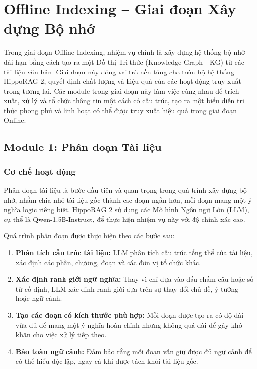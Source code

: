 \section{Offline Indexing – Giai đoạn Xây dựng Bộ nhớ}

Trong giai đoạn Offline Indexing, nhiệm vụ chính là xây dựng hệ thống bộ nhớ dài hạn bằng cách tạo ra một Đồ thị Tri thức (Knowledge Graph - KG) từ các tài liệu văn bản. Giai đoạn này đóng vai trò nền tảng cho toàn bộ hệ thống HippoRAG 2, quyết định chất lượng và hiệu quả của các hoạt động truy xuất trong tương lai. Các module trong giai đoạn này làm việc cùng nhau để trích xuất, xử lý và tổ chức thông tin một cách có cấu trúc, tạo ra một biểu diễn tri thức phong phú và linh hoạt có thể được truy xuất hiệu quả trong giai đoạn Online.

\subsection{Module 1: Phân đoạn Tài liệu}

\subsubsection{Cơ chế hoạt động}
Phân đoạn tài liệu là bước đầu tiên và quan trọng trong quá trình xây dựng bộ nhớ, nhằm chia nhỏ tài liệu gốc thành các đoạn ngắn hơn, mỗi đoạn mang một ý nghĩa logic riêng biệt. HippoRAG 2 sử dụng các Mô hình Ngôn ngữ Lớn (LLM), cụ thể là Qwen-1.5B-Instruct, để thực hiện nhiệm vụ này với độ chính xác cao.

Quá trình phân đoạn được thực hiện theo các bước sau:
\begin{enumerate}
    \item \textbf{Phân tích cấu trúc tài liệu:} LLM phân tích cấu trúc tổng thể của tài liệu, xác định các phần, chương, đoạn và các đơn vị tổ chức khác.
    \item \textbf{Xác định ranh giới ngữ nghĩa:} Thay vì chỉ dựa vào dấu chấm câu hoặc số từ cố định, LLM xác định ranh giới dựa trên sự thay đổi chủ đề, ý tưởng hoặc ngữ cảnh.
    \item \textbf{Tạo các đoạn có kích thước phù hợp:} Mỗi đoạn được tạo ra có độ dài vừa đủ để mang một ý nghĩa hoàn chỉnh nhưng không quá dài để gây khó khăn cho việc xử lý tiếp theo.
    \item \textbf{Bảo toàn ngữ cảnh:} Đảm bảo rằng mỗi đoạn vẫn giữ được đủ ngữ cảnh để có thể hiểu độc lập, ngay cả khi được tách khỏi tài liệu gốc.
\end{enumerate}

